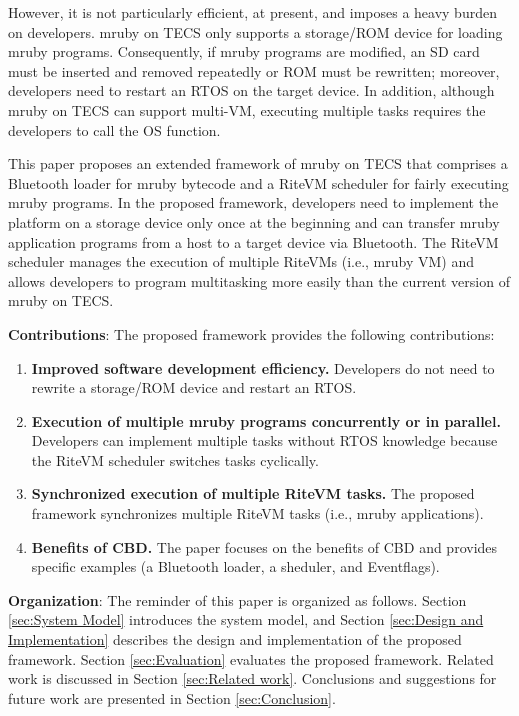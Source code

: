 \documentclass[conference]{IEEEtran/IEEEtran/IEEEtran}
\begin{document}
However, it is not particularly efficient, at present, and imposes a heavy burden on developers.
mruby on TECS only supports a storage/ROM device for loading mruby programs.
Consequently, if mruby programs are modified, an SD card must be inserted and removed repeatedly or ROM must be rewritten; moreover, developers need to restart an RTOS on the target device.
In addition, although mruby on TECS can support multi-VM, executing multiple tasks requires the developers to call the OS function.

This paper proposes an extended framework of mruby on TECS that comprises a Bluetooth loader for mruby bytecode and a RiteVM scheduler for fairly executing mruby programs.
In the proposed framework, developers need to implement the platform on a storage device only once at the beginning and can transfer mruby application programs from a host to a target device via Bluetooth.
The RiteVM scheduler manages the execution of multiple RiteVMs (i.e., mruby VM) and allows developers to program multitasking more easily than the current version of mruby on TECS.

{\bf Contributions}: The proposed framework provides the following contributions:
\begin{enumerate}
\item {\bf Improved software development efficiency.}
Developers do not need to rewrite a storage/ROM device and restart an RTOS.
\item {\bf Execution of multiple mruby programs concurrently or in parallel.}
Developers can implement multiple tasks without RTOS knowledge because the RiteVM scheduler switches tasks cyclically.
\item {\bf Synchronized execution of multiple RiteVM tasks.}
The proposed framework synchronizes multiple RiteVM tasks (i.e., mruby applications).
\item {\bf Benefits of CBD.}
The paper focuses on the benefits of CBD and provides specific examples (a Bluetooth loader, a sheduler, and Eventflags).
\end{enumerate}

{\bf Organization}: The reminder of this paper is organized as follows.
Section \ref{sec:System Model} introduces the system model, and Section \ref{sec:Design and Implementation} describes the design and implementation of the proposed framework.
Section \ref{sec:Evaluation} evaluates the proposed framework.
Related work is discussed in Section \ref{sec:Related work}.
Conclusions and suggestions for future work are presented in Section \ref{sec:Conclusion}.
\end{document}
